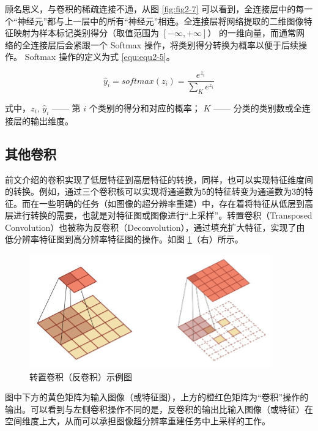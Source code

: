 顾名思义，与卷积的稀疏连接不通，从图 \ref{fig:fig2-7} 可以看到，全连接层中的每一个“神经元”都与上一层中的所有“神经元”相连。全连接层将网络提取的二维图像特征映射为样本标记类别得分（取值范围为 $\left[-\infty,+\infty\right]$） 的一维向量，而通常网络的全连接层后会紧跟一个 Softmax 操作，将类别得分转换为概率以便于后续操作。 Softmax 操作的定义为式 \ref{equ:equ2-5}。

\begin{equation}
	{\hat{y}}_i=softmax(z_i)=\frac{e^{z_i}}{\sum_{K} e^{z_i}}
	\label{equ:equ2-5}
\end{equation}

\noindent 式中，$z_i$, ${\hat{y}}_i$ —— 第 $i$ 个类别的得分和对应的概率；\newline
\indent\quad $K$ —— 分类的类别数或全连接层的输出维度。

\subsection{其他卷积}

前文介绍的卷积实现了低层特征到高层特征的转换，同样，也可以实现特征维度间的转换。例如，通过三个卷积核可以实现将通道数为5的特征转变为通道数为3的特征。而在一些明确的任务（如图像的超分辨率重建）中，存在着将特征从低层到高层进行转换的需要，也就是对特征图或图像进行“上采样”。转置卷积（Transposed Convolution）也被称为反卷积（Deconvolution），通过填充扩大特征，实现了由低分辨率特征图到高分辨率特征图的操作。如图 \ref{fig:fig2-8}（右）所示。

\begin{figure}[!htbp]
	\vspace{-0.5cm}  %
	\centering
	\includegraphics{figures/9.png}
	\caption{转置卷积（反卷积）示例图}
	\label{fig:fig2-8}
	\vspace{-0.8cm}  %
\end{figure}

图中下方的黄色矩阵为输入图像（或特征图），上方的橙红色矩阵为“卷积”操作的输出。可以看到与左侧卷积操作不同的是，反卷积的输出比输入图像（或特征）在空间维度上大，从而可以承担图像超分辨率重建任务中上采样的工作。

